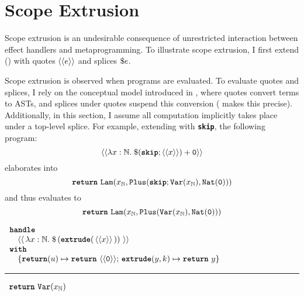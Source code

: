 \section{Scope Extrusion}\label{section:scope-extrusion-technical}
Scope extrusion is an undesirable consequence of unrestricted interaction between effect handlers and metaprogramming. To illustrate scope extrusion, I first extend \efflang{} () with quotes $\equote$ and splices $\splice$. 

Scope extrusion is observed when programs are evaluated. To evaluate quotes and splices, I rely on the conceptual model introduced in , where quotes convert terms to ASTs, and splices under quotes suspend this conversion ( makes this precise). Additionally, in this section, I assume all computation implicitly takes place under a top-level splice. For example, extending \efflang{} with \textbf{\texttt{skip}}, the following program:
\[\equote[{\lambda x: \mathbb{N}. \; \splice[{(\textbf{\texttt{skip}}; \equote[x])}] + \texttt{0}}]\]
elaborates into
\[\return{\Lam{\Binder{x}{\mathbb{N}}}{\texttt{Plus}(\textbf{\texttt{skip}};\Var{x}{\mathbb{N}}, \texttt{Nat}(\texttt{0}))}}\]
and thus evaluates to 
\[\return{\Lam{\Binder{x}{\mathbb{N}}}{\texttt{Plus}(\Var{x}{\mathbb{N}}, \texttt{Nat}(\texttt{0}))}}\]

\begin{code}
  \begin{efflst}
    $\begin{array}{l}
      \textbf{\texttt{handle}} \\
      \quad \equote[\, {\lambda x:\mathbb{N}.\; \splice[\, {(\textbf{\texttt{extrude}}(\, \equote[x] \, ))}\, ]} \, ] \\
      \textbf{\texttt{with}} \\
      \quad \{ \textbf{\texttt{return}}(u) \mapsto {\return{\equote[\texttt{0}]}}; \, \textbf{\texttt{extrude}}(y, k) \mapsto {\return{y}}\}\\
    \end{array}$
  
    \vspace{2mm} 
  \textcolor{effComment}{\hrule height 0.2mm \relax}
  \vspace{2mm} 
  
  \textcolor{effComment}{$\begin{array}{l}\return{\Var{x}{\mathbb{N}}}\end{array}$}
  
  \end{efflst}
  \label{listing:efflang-scope-extrusion}
  \end{code}

